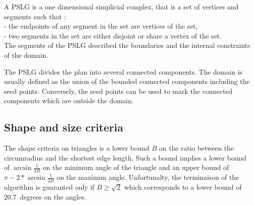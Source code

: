 {A PSLG is a one dimensional simplicial complex, that
is a set of vertices and segments such that : \\
- the endpoints of any segment in the set are vertices of the set, \\
- two segments in the set are either disjoint or share a vertex of the 
set. \\
The segments of the PSLG described the boundaries and the internal
constraints of the domain.

The PSLG divides the plan into several connected components.
The domain is usually defined as  the union of the 
bounded connected components including 
the seed points.  Conversely, the seed points can be used to mark
the connected components which are outside the domain.







\subsection{Shape and size criteria}
\label{sec:Mesh_2_criteria}

The shape criteria on triangles is a lower bound $B$ on the ratio
between the circumradius and the shortest edge length.
Such a bound implies  a lower bound  of $\arcsin{\frac{1}{2B}}$
on the  minimum angle of the triangle  and an upper
bound of $\pi - 2* \arcsin{\frac{1}{2B}}$ on the maximun angle.
Unfortunalty, the
terminaison of the algorithm is guaranted only if $B \ge \sqrt{2}$
which corresponds to a lower bound of $20.7$~degrees
on the angles.


}
